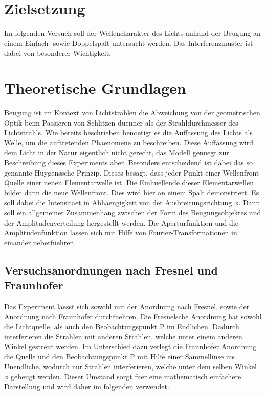 \section{Zielsetzung}
Im folgenden Versuch soll der Wellencharakter des Lichts anhand der Beugung an einem Einfach- sowie Doppelspalt untersucht werden. Das Interferenzmuster ist dabei von besonderer Wichtigkeit.
\section{Theoretische Grundlagen}
Beugung ist im Kontext von Lichtstrahlen die Abweichung von der geometrischen Optik beim Passieren von Schlitzen duenner als der Strahldurchmesser des Lichtstrahls. Wie bereits beschrieben benoetigt es die Auffassung des Lichts als Welle, um die auftretenden Phaenomene zu beschreiben. Diese Auffassung wird dem Licht in der Natur eigentlich nicht gerecht, das Modell genuegt zur Beschreibung dieses Experiments aber. Besonders entscheidend ist dabei das so genannte Huygenssche Prinzip. Dieses besagt, dass jeder Punkt einer Wellenfront Quelle einer neuen Elementarwelle ist. Die Einhuellende dieser Elementarwellen bildet dann die neue Wellenfront. Dies wird hier an einem Spalt demonstriert. Es soll dabei die Intensitaet in Abhaengigkeit von der Ausbreitungsrichtung $\phi$. Dann soll ein allgemeiner Zusammenhang zwischen der Form des Beugungsobjektes und der Amplitudenverteilung hergestellt werden. Die Aperturfunktion und die Amplitudenfunktion lassen sich mit Hilfe von Fourier-Transformationen in einander ueberfuehren.
\subsection{Versuchsanordnungen nach Fresnel und Fraunhofer}
Das Experiment laesst sich sowohl mit der Anordnung nach Fresnel, sowie der Anordnung nach Fraunhofer durchfuehren. Die Fresnelsche Anordnung hat sowohl die Lichtquelle, als auch den Beobachtungspunkt P im Endlichen. Dadurch interferieren die Strahlen mit anderen Strahlen, welche unter einem anderen Winkel gestreut werden. Im Unterschied dazu verlegt die Fraunhofer Anordnung die Quelle und den Beobachtungspunkt P mit Hilfe einer Sammellinse ins Unendliche, wodurch nur Strahlen interferieren, welche unter dem selben Winkel $\phi$ gebeugt werden. Dieser Umstand sorgt fuer eine mathematisch einfachere Darstellung und wird daher im folgenden verwendet.
